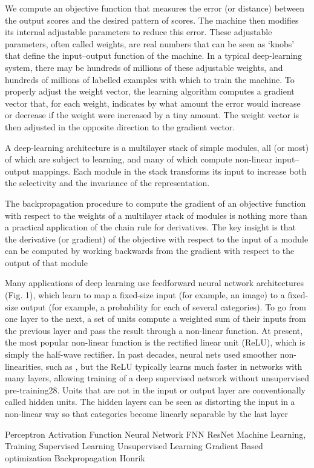 We compute an objective function that measures the error (or distance) between the output scores and the desired pattern of scores. The 
machine then modifies its internal adjustable parameters to reduce 
this error. These adjustable parameters, often called weights, are real 
numbers that can be seen as ‘knobs’ that define the input–output function of the machine. In a typical deep-learning system, there may be 
hundreds of millions of these adjustable weights, and hundreds of 
millions of labelled examples with which to train the machine. 
To properly adjust the weight vector, the learning algorithm computes a gradient vector that, for each weight, indicates by what amount 
the error would increase or decrease if the weight were increased by a 
tiny amount. The weight vector is then adjusted in the opposite direction to the gradient vector. 

A deep-learning architecture is a multilayer stack of simple modules, all (or most) of which are subject to learning, and many of which 
compute non-linear input–output mappings. Each module in the 
stack transforms its input to increase both the selectivity and the 
invariance of the representation.

The backpropagation procedure to compute the gradient of an 
objective function with respect to the weights of a multilayer stack 
of modules is nothing more than a practical application of the chain rule for derivatives. The key insight is that the derivative (or gradient) of the objective with respect to the input of a module can be 
computed by working backwards from the gradient with respect to 
the output of that module

Many applications of deep learning use feedforward neural network architectures (Fig. 1), which learn to map a fixed-size input 
(for example, an image) to a fixed-size output (for example, a probability for each of several categories). To go from one layer to the 
next, a set of units compute a weighted sum of their inputs from the 
previous layer and pass the result through a non-linear function. At 
present, the most popular non-linear function is the rectified linear 
unit (ReLU), which is simply the half-wave rectifier. 
In past decades, neural nets used smoother non-linearities, such as 
, but the ReLU typically learns much faster 
in networks with many layers, allowing training of a deep supervised 
network without unsupervised pre-training28. Units that are not in 
the input or output layer are conventionally called hidden units. The 
hidden layers can be seen as distorting the input in a non-linear way 
so that categories become linearly separable by the last layer 

Perceptron
Activation Function
Neural Network
FNN
ResNet
Machine Learning, Training 
Supervised Learning
Unsupervised Learning
Gradient Based optimization
Backpropagation 
Honrik 